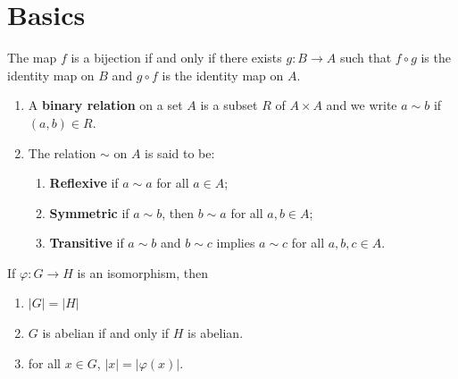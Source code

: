 \section{Basics}

\begin{prop}[Bijection]
    The map \( f  \) is a bijection if and only if there exists \( g : B \to A  \) such that \( f \circ g   \) is the identity map on \( B  \) and \( g \circ f  \) is the identity map on \( A  \).
\end{prop}

\begin{definition}
    \begin{enumerate}
        \item[(1)] A \textbf{binary relation} on a set \( A  \) is a subset \( R  \) of \( A \times A  \) and we write \( a \sim b  \) if \( (a,b)  \in R \).
        \item[(2)] The relation \( \sim  \) on \( A  \) is said to be:
            \begin{enumerate} 
                \item[(a)] \textbf{Reflexive} if \( a \sim a  \) for all \( a \in A  \);
                \item[(b)] \textbf{Symmetric} if \( a \sim b  \), then \( b \sim a  \) for all \( a,b \in A \);
                \item[(c)] \textbf{Transitive} if \( a \sim b  \) and \( b \sim c  \) implies \( a \sim c  \) for all \( a,b,c \in A  \).
            \end{enumerate}
    \end{enumerate}
\end{definition}

\begin{prop}
    If \( \varphi : G \to H  \) is an isomorphism, then 
    \begin{enumerate}
        \item[(a)] \( | G |  = | H |  \)
        \item[(b)] \( G  \) is abelian if and only if \( H  \) is abelian.
        \item[(c)] for all \( x \in G  \), \( | x  |  = | \varphi(x) |  \).
    \end{enumerate}
\end{prop}


